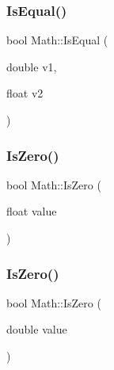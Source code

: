 \mbox{\label{namespace_math_a5eeb1781896881768b92899090b7d750}} 
\subsubsection{\texorpdfstring{Is\+Equal()}{IsEqual()}\hspace{0.1cm}{\footnotesize\ttfamily [4/4]}}
{\footnotesize\ttfamily bool Math\+::\+Is\+Equal (\begin{DoxyParamCaption}\item[{double}]{v1,  }\item[{float}]{v2 }\end{DoxyParamCaption})}

\mbox{\label{namespace_math_aa85ef15b6a4171111a31bb17db917dd9}} 
\subsubsection{\texorpdfstring{Is\+Zero()}{IsZero()}\hspace{0.1cm}{\footnotesize\ttfamily [1/2]}}
{\footnotesize\ttfamily bool Math\+::\+Is\+Zero (\begin{DoxyParamCaption}\item[{float}]{value }\end{DoxyParamCaption})}

\mbox{\label{namespace_math_a50e4a54ad68fe1c946ba6b5c425e47ad}} 
\subsubsection{\texorpdfstring{Is\+Zero()}{IsZero()}\hspace{0.1cm}{\footnotesize\ttfamily [2/2]}}
{\footnotesize\ttfamily bool Math\+::\+Is\+Zero (\begin{DoxyParamCaption}\item[{double}]{value }\end{DoxyParamCaption})}

\mbox{\label{namespace_math_a2ceb0ab69bdfd0752989983241d1055e}} 
